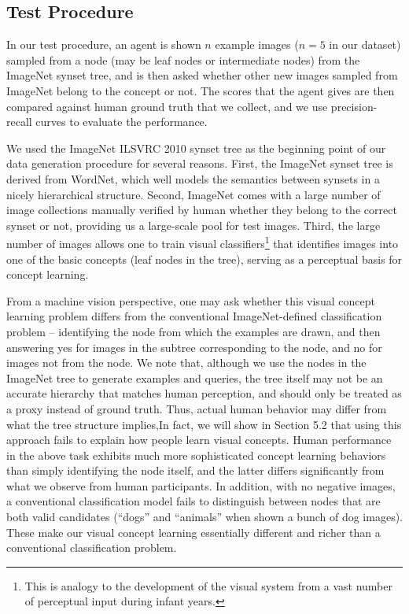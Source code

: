\subsection{Test Procedure}

In our test procedure, an agent is shown $n$ example images ($n=5$ in our dataset) sampled from a node (may be leaf nodes or intermediate nodes) from the ImageNet synset tree, and is then asked whether other new images sampled from ImageNet belong to the concept or not. The scores that the agent gives are then compared against human ground truth that we collect, and we use precision-recall curves to evaluate the performance.


We used the ImageNet ILSVRC 2010 synset tree as the beginning point of our data generation procedure for several reasons. First, the ImageNet synset tree is derived from WordNet, which well models the semantics between synsets in a nicely hierarchical structure. Second, ImageNet comes with a large number of image collections manually verified by human whether they belong to the correct synset or not, providing us a large-scale pool for test images. Third, the large number of images allows one to train visual classifiers\footnote{This is analogy to the development of the visual system from a vast number of perceptual input during infant years.} that identifies images into one of the basic concepts (leaf nodes in the tree), serving as a perceptual basis for concept learning.

From a machine vision perspective, one may ask whether this visual concept learning problem differs from the conventional ImageNet-defined classification problem -- identifying the node from which the examples are drawn, and then answering yes for images in the subtree corresponding to the node, and no for images not from the node. We note that, although we use the nodes in the ImageNet tree to generate examples and queries, the tree itself may not be an accurate hierarchy that matches human perception, and should only be treated as a proxy instead of ground truth. Thus, actual human behavior may differ from what the tree structure implies,In fact, we will show in Section 5.2 that using this approach fails to explain how people learn visual concepts. Human performance in the above task exhibits much more sophisticated concept learning behaviors than simply identifying the node itself, and the latter differs significantly from what we observe from human participants. In addition, with no negative images, a conventional classification model fails to distinguish between nodes that are both valid candidates (\eg ``dogs'' and ``animals'' when shown a bunch of dog images). These make our visual concept learning essentially different and richer than a conventional classification problem.

